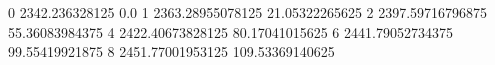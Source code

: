 0 2342.236328125 0.0
1 2363.28955078125 21.05322265625
2 2397.59716796875 55.36083984375
4 2422.40673828125 80.17041015625
6 2441.79052734375 99.55419921875
8 2451.77001953125 109.53369140625
